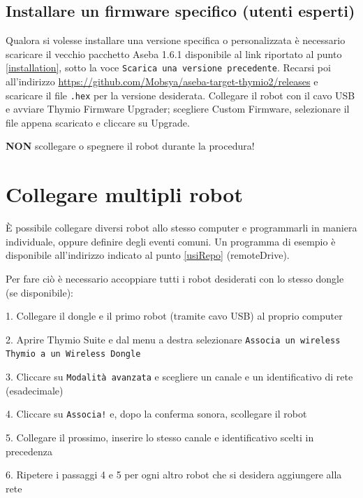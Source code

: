 \documentclass[12pt]{article}
\begin{document}
	
	\subsection{Installare un firmware specifico (utenti esperti)}
	
	Qualora si volesse installare una versione specifica o personalizzata è necessario scaricare il vecchio pacchetto Aseba 1.6.1 disponibile al link riportato al punto \ref{installation}, sotto la voce \texttt{Scarica una versione precedente}.	
	Recarsi poi all'indirizzo \url{https://github.com/Mobsya/aseba-target-thymio2/releases} e scaricare il file \texttt{.hex} per la versione desiderata. Collegare il robot con il cavo USB e avviare Thymio Firmware Upgrader; scegliere Custom Firmware, selezionare il file appena scaricato e cliccare su Upgrade. 
	
	\textbf{NON} scollegare o spegnere il robot durante la procedura!
	
	\newpage
	
		
\section{Collegare multipli robot}\label{multi-robot}

	È possibile collegare diversi robot allo stesso computer e programmarli in maniera individuale, oppure definire degli eventi comuni. Un programma di esempio è disponibile all'indirizzo indicato al punto \ref{usiRepo} (remoteDrive).
	
	Per fare ciò è necessario accoppiare tutti i robot desiderati con lo stesso dongle (se disponibile):
	
	1. Collegare il dongle e il primo robot (tramite cavo USB) al proprio computer
	
	2. Aprire Thymio Suite e dal menu a destra selezionare \texttt{Associa un wireless Thymio a un Wireless Dongle}
	
	3. Cliccare su \texttt{Modalità avanzata} e scegliere un canale e un identificativo di rete (esadecimale)
	
	4. Cliccare su \texttt{Associa!} e, dopo la conferma sonora, scollegare il robot
	
	5. Collegare il prossimo, inserire lo stesso canale e identificativo scelti in precedenza
	
	6. Ripetere i passaggi 4 e 5 per ogni altro robot che si desidera aggiungere alla rete
	
\end{document}
